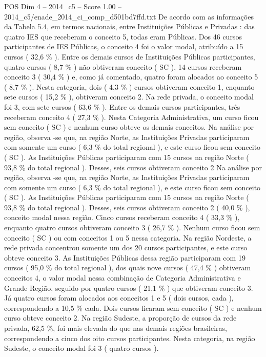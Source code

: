 \begin{textsample}{POS Dim 4 – 2014\_c5 – Score 1.00 – 2014\_c5/enade\_2014\_ci\_comp\_d501bd7ffd.txt}
De acordo com as informações da Tabela 5.4, em termos nacionais, entre Instituições Públicas e Privadas : das quatro IES que receberam o conceito 5, todas eram Públicas.
Dos 46 cursos participantes de IES Públicas, o conceito 4 foi o valor modal, atribuído a 15 cursos ( 32,6 \% ).
Entre os demais cursos de Instituições Públicas participantes, quatro cursos ( 8,7 \% ) não obtiveram conceito ( SC ), 14 cursos receberam conceito 3 ( 30,4 \% ) e, como já comentado, quatro foram alocados ao conceito 5 ( 8,7 \% ).
Nesta categoria, dois ( 4,3 \% ) cursos obtiveram conceito 1, enquanto sete cursos ( 15,2 \% ), obtiveram conceito 2.
Na rede privada, o conceito modal foi 3, com sete cursos ( 63,6 \% ).
Entre os demais cursos participantes, três receberam conceito 4 ( 27,3 \% ).
Nesta Categoria Administrativa, um curso ficou sem conceito ( SC ) e nenhum curso obteve os demais conceitos.
Na análise por região, observa -se que, na região Norte, as Instituições Privadas participaram com somente um curso ( 6,3 \% do total regional ), e este curso ficou sem conceito ( SC ).
As Instituições Públicas participaram com 15 cursos na região Norte ( 93,8 \% do total regional ).
Desses, seis cursos obtiveram conceito 2 Na análise por região, observa -se que, na região Norte, as Instituições Privadas participaram com somente um curso ( 6,3 \% do total regional ), e este curso ficou sem conceito ( SC ).
As Instituições Públicas participaram com 15 cursos na região Norte ( 93,8 \% do total regional ).
Desses, seis cursos obtiveram conceito 2 ( 40,0 \% ), conceito modal nessa região.
Cinco cursos receberam conceito 4 ( 33,3 \% ), enquanto quatro cursos obtiveram conceito 3 ( 26,7 \% ).
Nenhum curso ficou sem conceito ( SC ) ou com conceitos 1 ou 5 nessa categoria.
Na região Nordeste, a rede privada concentrou somente um dos 20 cursos participantes, e este curso obteve conceito 3.
As Instituições Públicas dessa região participaram com 19 cursos ( 95,0 \% do total regional ), dos quais nove cursos ( 47,4 \% ) obtiveram conceitos 4, o valor modal nessa combinação de Categoria Administrativa e Grande Região, seguido por quatro cursos ( 21,1 \% ) que obtiveram conceito 3.
Já quatro cursos foram alocados aos conceitos 1 e 5 ( dois cursos, cada ), correspondendo a 10,5 \% cada.
Dois cursos ficaram sem conceito ( SC ) e nenhum curso obteve conceito 2.
Na região Sudeste, a proporção de cursos da rede privada, 62,5 \%, foi mais elevada do que nas demais regiões brasileiras, correspondendo a cinco dos oito cursos participantes.
Nesta categoria, na região Sudeste, o conceito modal foi 3 ( quatro cursos ).

\end{textsample}
